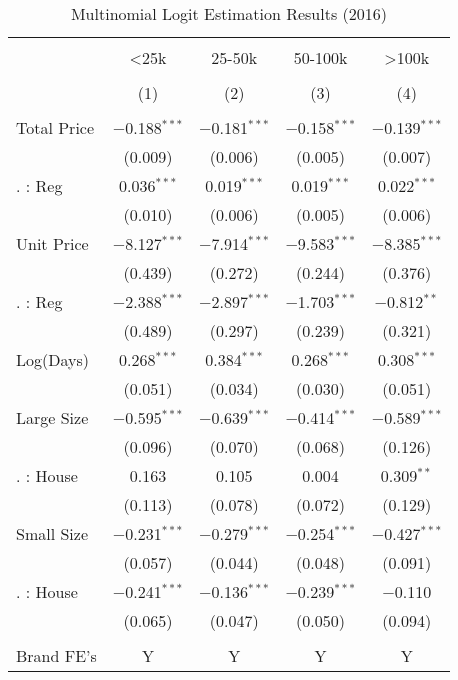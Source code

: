 \begin{table}[!htbp] \centering
  \caption{Multinomial Logit Estimation Results (2016)}
  \label{tab:mlogit2016}
\begin{tabular}{@{\extracolsep{5pt}}lcccc}
\\[-1.8ex]\hline
\hline \\[-1.8ex]
 & <25k & 25-50k & 50-100k & >100k \\
\\[-1.8ex] & (1) & (2) & (3) & (4)\\
\hline \\[-1.8ex]
 Total Price & $-$0.188$^{***}$ & $-$0.181$^{***}$ & $-$0.158$^{***}$ & $-$0.139$^{***}$ \\
  & (0.009) & (0.006) & (0.005) & (0.007) \\
  . : Reg & 0.036$^{***}$ & 0.019$^{***}$ & 0.019$^{***}$ & 0.022$^{***}$ \\
  & (0.010) & (0.006) & (0.005) & (0.006) \\
  Unit Price & $-$8.127$^{***}$ & $-$7.914$^{***}$ & $-$9.583$^{***}$ & $-$8.385$^{***}$ \\
  & (0.439) & (0.272) & (0.244) & (0.376) \\
  . : Reg & $-$2.388$^{***}$ & $-$2.897$^{***}$ & $-$1.703$^{***}$ & $-$0.812$^{**}$ \\
  & (0.489) & (0.297) & (0.239) & (0.321) \\
  Log(Days) & 0.268$^{***}$ & 0.384$^{***}$ & 0.268$^{***}$ & 0.308$^{***}$ \\
  & (0.051) & (0.034) & (0.030) & (0.051) \\
  Large Size & $-$0.595$^{***}$ & $-$0.639$^{***}$ & $-$0.414$^{***}$ & $-$0.589$^{***}$ \\
  & (0.096) & (0.070) & (0.068) & (0.126) \\
  . : House & 0.163 & 0.105 & 0.004 & 0.309$^{**}$ \\
  & (0.113) & (0.078) & (0.072) & (0.129) \\
  Small Size & $-$0.231$^{***}$ & $-$0.279$^{***}$ & $-$0.254$^{***}$ & $-$0.427$^{***}$ \\
  & (0.057) & (0.044) & (0.048) & (0.091) \\
  . : House & $-$0.241$^{***}$ & $-$0.136$^{***}$ & $-$0.239$^{***}$ & $-$0.110 \\
  & (0.065) & (0.047) & (0.050) & (0.094) \\
 \hline \\[-1.8ex]
Brand FE's & Y & Y & Y & Y \\

\end{tabular}
\end{table}
